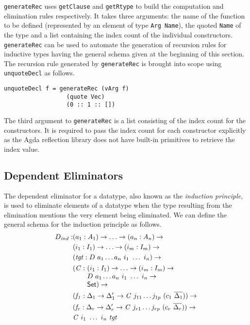 \documentclass[sigplan,10pt]{acmart}
\begin{document}
\normalsize

{\tt generateRec} uses {\tt getClause} and {\tt getRtype} to build the computation and elimination rules respectively. It takes three arguments: the name of the function to be defined (represented by an element of type {\tt Arg Name}), the quoted {\tt Name} of the type and a list containing the index count of the individual constructors. {\tt generateRec} can be used to automate the generation of recursion rules for inductive types having the general schema given at the beginning of this section. The recursion rule generated by {\tt generateRec} is brought into scope using {\tt unquoteDecl} as follows.

\begin{center}
\begingroup
\begin{BVerbatim}
unquoteDecl f = generateRec (vArg f)
                  (quote Vec) 
                  (0 :: 1 :: [])
\end{BVerbatim}
\endgroup
\end{center}

\normalsize

The third argument to {\tt generateRec} is a list consisting of the index count for the constructors. It is required to pass the index count for each constructor explicitly as the Agda reflection library does not have built-in primitives to retrieve the index value.

\subsection{Dependent Eliminators}
\label{sec:sec3.2}

The dependent eliminator for a datatype, also known as the \emph{induction principle}, is used to eliminate elements of a datatype when the type resulting from the elimination mentions the very element being eliminated. We can define the general schema for the induction principle as follows.
\begin{align*}
D_{\mathit{ind}} : & (a_1 : A_1) \to \ldots \to (a_n : A_n) \to\\
& (i_1 : I_1) \to \ldots \to (i_m : I_m) \to\\
& (\mathit{tgt} : D\ a_1 \ldots a_n\ i_1\ \ldots\ i_n) \to\\
& \begin{array}{@{}l@{}l}(\mathit{C} :\ & (i_1 : I_1) \to \ldots \to (i_m : I_m) \to\\  & D\ a_1 \ldots a_n\ i_1\ \ldots\ i_n \to\\ &\SET{})\to\end{array} \\
& (\mathit{f_1} : \Delta_1 \to  \Delta_1^\prime \to \mathit{C}\ j_{11} \ldots j_{1p}\ (c_1\ \overline{\Delta_1})) \to \\
& (\mathit{f_r} : \Delta_r \to  \Delta_r^\prime \to \mathit{C}\ j_{r1} \ldots j_{rp}\ (c_r\ \overline{\Delta_r})) \to \\
& \mathit{C}\ i_1\ \ldots\ i_n\ \mathit{tgt}
\end{align*}
\end{document}
